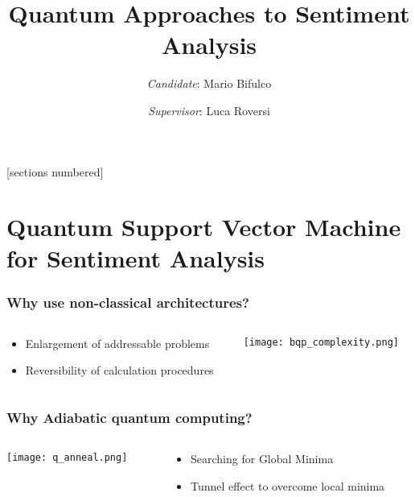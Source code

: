 \documentclass[aspectratio=169]{beamer}
\title{Quantum Approaches to Sentiment Analysis}
\author{\emph{Candidate}: Mario Bifulco}
\date{\emph{Supervisor}: Luca Roversi}
\institute{University of Turin}
\begin{document}
[sections numbered]

\begin{frame}
    \titlepage
\end{frame}

\section{Quantum Support Vector Machine for Sentiment Analysis}

\begin{frame}\frametitle{Why use non-classical architectures?}

    \begin{columns}
        \begin{column}{0.4\textwidth}
            \begin{itemize}
                \item Enlargement of addressable problems
                \item Reversibility of calculation procedures
            \end{itemize}
        \end{column}
        \begin{column}{0.6\textwidth}
            \begin{flushright}
                \texttt{[image: bqp\_complexity.png]}
            \end{flushright}
        \end{column}
    \end{columns}

\end{frame}

\begin{frame}\frametitle{Why Adiabatic quantum computing?}

    \begin{columns}
        \begin{column}{0.6\textwidth}
            \begin{flushleft}
                \texttt{[image: q\_anneal.png]}
            \end{flushleft}
        \end{column}
        \begin{column}{0.4\textwidth}
            \begin{itemize}
                \item Searching for Global Minima
                \item Tunnel effect to overcome local minima
            \end{itemize}
        \end{column}
    \end{columns}

\end{frame}
\end{document}
